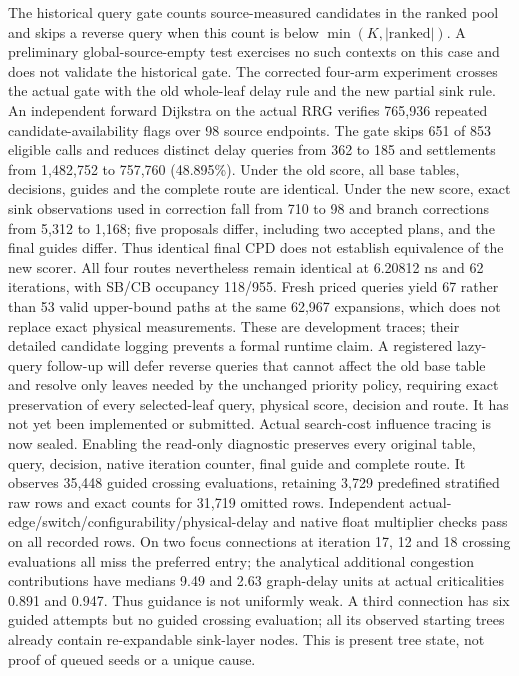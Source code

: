 \documentclass[conference,10pt]{IEEEtran}
\begin{document}
The historical query gate counts source-measured candidates in the ranked pool and skips a reverse query when this count is below $\min(K,|\mathrm{ranked}|)$. A preliminary global-source-empty test exercises no such contexts on this case and does not validate the historical gate. The corrected four-arm experiment crosses the actual gate with the old whole-leaf delay rule and the new partial sink rule. An independent forward Dijkstra on the actual RRG verifies 765,936 repeated candidate-availability flags over 98 source endpoints. The gate skips 651 of 853 eligible calls and reduces distinct delay queries from 362 to 185 and settlements from 1,482,752 to 757,760 (48.895\%). Under the old score, all base tables, decisions, guides and the complete route are identical. Under the new score, exact sink observations used in correction fall from 710 to 98 and branch corrections from 5,312 to 1,168; five proposals differ, including two accepted plans, and the final guides differ. Thus identical final CPD does not establish equivalence of the new scorer. All four routes nevertheless remain identical at 6.20812 ns and 62 iterations, with SB/CB occupancy 118/955. Fresh priced queries yield 67 rather than 53 valid upper-bound paths at the same 62,967 expansions, which does not replace exact physical measurements. These are development traces; their detailed candidate logging prevents a formal runtime claim. A registered lazy-query follow-up will defer reverse queries that cannot affect the old base table and resolve only leaves needed by the unchanged priority policy, requiring exact preservation of every selected-leaf query, physical score, decision and route. It has not yet been implemented or submitted. Actual search-cost influence tracing is now sealed. Enabling the read-only diagnostic preserves every original table, query, decision, native iteration counter, final guide and complete route. It observes 35,448 guided crossing evaluations, retaining 3,729 predefined stratified raw rows and exact counts for 31,719 omitted rows. Independent actual-edge/switch/configurability/physical-delay and native float multiplier checks pass on all recorded rows. On two focus connections at iteration 17, 12 and 18 crossing evaluations all miss the preferred entry; the analytical additional congestion contributions have medians 9.49 and 2.63 graph-delay units at actual criticalities 0.891 and 0.947. Thus guidance is not uniformly weak. A third connection has six guided attempts but no guided crossing evaluation; all its observed starting trees already contain re-expandable sink-layer nodes. This is present tree state, not proof of queued seeds or a unique cause.
\end{document}
